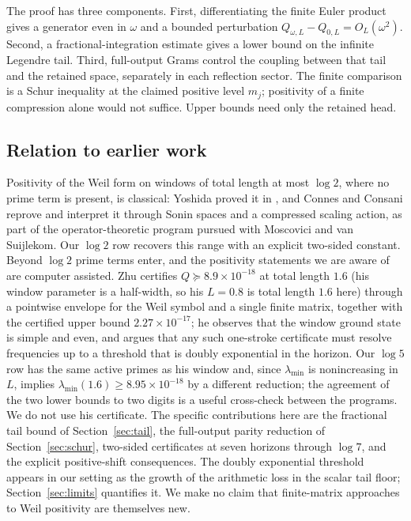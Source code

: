 \documentclass[11pt]{article}
\numberwithin{equation}{section}
\theoremstyle{definition}
\theoremstyle{remark}
\begin{document}
The proof has three components. First, differentiating the finite Euler
product gives a generator even in $\omega$ and a bounded perturbation
$Q_{\omega,L}-Q_{0,L}=O_L(\omega^2)$. Second, a fractional-integration estimate
gives a lower bound on the infinite Legendre tail. Third, full-output Grams
control the coupling between that tail and the retained space, separately in
each reflection sector. The finite comparison is a Schur inequality at the
claimed positive level $m_j$; positivity of a finite compression alone
would not suffice. Upper bounds need only the retained head.

\subsection{Relation to earlier work}

Positivity of the Weil form on windows of total length at most $\log2$, where
no prime term is present, is classical: Yoshida proved it in
\cite{Yoshida1992}, and Connes and Consani \cite{ConnesConsani2020} reprove
and interpret it through Sonin spaces and a compressed scaling action, as part
of the operator-theoretic program pursued with Moscovici and van Suijlekom.
Our $\log2$ row recovers this range with an explicit two-sided constant.
Beyond $\log2$ prime terms enter, and the positivity statements we are aware
of are computer assisted. Zhu \cite{Zhu2026} certifies
$Q\succeq8.9\times10^{-18}$ at total length $1.6$ (his window parameter is a
half-width, so his $L=0.8$ is total length $1.6$ here) through a pointwise
envelope for the Weil symbol and a single finite matrix, together with the
certified upper bound $2.27\times10^{-17}$; he observes that the window ground
state is simple and even, and argues that any such one-stroke certificate must
resolve frequencies up to a threshold that is doubly exponential in the
horizon. Our $\log5$ row has the same active primes as his window and, since
$\lambda_{\min}$ is nonincreasing in $L$, implies
$\lambda_{\min}(1.6)\ge8.95\times10^{-18}$ by a different reduction; the
agreement of the two lower bounds to two digits is a useful cross-check between
the programs. We do not use his certificate. The specific contributions here
are the fractional tail bound of Section~\ref{sec:tail}, the full-output
parity reduction of Section~\ref{sec:schur}, two-sided certificates at seven
horizons through $\log7$, and the explicit positive-shift consequences. The
doubly exponential threshold appears in our setting as the growth of the
arithmetic loss in the scalar tail floor; Section~\ref{sec:limits} quantifies
it. We make no claim that finite-matrix approaches to Weil positivity are
themselves new.
\end{document}
